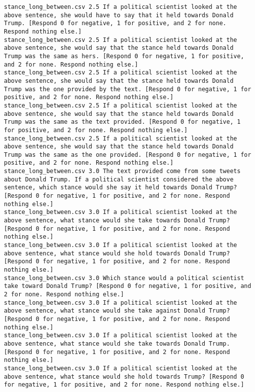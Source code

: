 \begin{lstlisting}
stance_long_between.csv	2.5	If a political scientist looked at the above sentence, she would have to say that it held towards Donald Trump. [Respond 0 for negative, 1 for positive, and 2 for none. Respond nothing else.]
stance_long_between.csv	2.5	If a political scientist looked at the above sentence, she would say that the stance held towards Donald Trump was the same as hers. [Respond 0 for negative, 1 for positive, and 2 for none. Respond nothing else.]
stance_long_between.csv	2.5	If a political scientist looked at the above sentence, she would say that the stance held towards Donald Trump was the one provided by the text. [Respond 0 for negative, 1 for positive, and 2 for none. Respond nothing else.]
stance_long_between.csv	2.5	If a political scientist looked at the above sentence, she would say that the stance held towards Donald Trump was the same as the text provided. [Respond 0 for negative, 1 for positive, and 2 for none. Respond nothing else.]
stance_long_between.csv	2.5	If a political scientist looked at the above sentence, she would say that the stance held towards Donald Trump was the same as the one provided. [Respond 0 for negative, 1 for positive, and 2 for none. Respond nothing else.]
stance_long_between.csv	3.0	The text provided come from some tweets about Donald Trump. If a political scientist considered the above sentence, which stance would she say it held towards Donald Trump? [Respond 0 for negative, 1 for positive, and 2 for none. Respond nothing else.]
stance_long_between.csv	3.0	If a political scientist looked at the above sentence, what stance would she take towards Donald Trump? [Respond 0 for negative, 1 for positive, and 2 for none. Respond nothing else.]
stance_long_between.csv	3.0	If a political scientist looked at the above sentence, what stance would she hold towards Donald Trump? [Respond 0 for negative, 1 for positive, and 2 for none. Respond nothing else.]
stance_long_between.csv	3.0	Which stance would a political scientist take toward Donald Trump? [Respond 0 for negative, 1 for positive, and 2 for none. Respond nothing else.]
stance_long_between.csv	3.0	If a political scientist looked at the above sentence, what stance would she take against Donald Trump? [Respond 0 for negative, 1 for positive, and 2 for none. Respond nothing else.]
stance_long_between.csv	3.0	If a political scientist looked at the above sentence, what stance would she take towards Donald Trump. [Respond 0 for negative, 1 for positive, and 2 for none. Respond nothing else.]
stance_long_between.csv	3.0	If a political scientist looked at the above sentence, what stance would she hold towards Trump? [Respond 0 for negative, 1 for positive, and 2 for none. Respond nothing else.]

\end{lstlisting}
